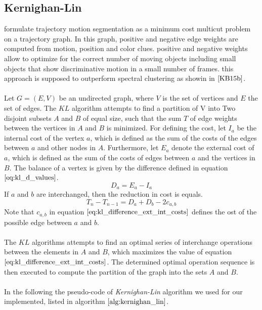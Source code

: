 \subsection{Kernighan-Lin} 
formulate trajectory motion segmentation as a minimum cost multicut problem on a trajectory graph. In this graph, positive and negative edge weights are computed from motion, position and color clues. positive and negative weights allow to optimize for the correct number of moving objects including small objects that show discriminative motion in a small number of frames. this approach is supposed to outperform spectral clustering as showin in $\cite{KB15b}$. \\ \\
Let $G = (E, V)$ be an undirected graph, where $V$ is the set of vertices and $E$ the set of edges. The $KL$ algorithm attempts to find a partition of V into Two disjoint subsets $A$ and $B$ of equal size, such that the sum $T$ of edge weights between the vertices in $A$ and $B$ is minimized. For defining the cost, let $I_a$ be the internal cost of the vertex $a$, which is defined as the sum of the costs of the edges between $a$ and other nodes in $A$. Furthermore, let $E_a$ denote the external cost of $a$, which is defined as the sum of the costs of edges between $a$ and the vertices in $B$. The balance of a vertex is given by the difference defined in equation $\ref{eq:kl_d_values}$.
\begin{equation}
	D_a = E_a - I_a
\label{eq:kl_d_values}
\end{equation}
If $a$ and $b$ are interchanged, then the reduction in cost is equals.
\begin{equation}
	T_{n} - T_{n-1} = D_a + D_b - 2c_{a,b}
\label{eq:kl_difference_ext_int_costs}
\end{equation}
Note that $c_{a,b}$ in equation $\ref{eq:kl_difference_ext_int_costs}$ defines the ost of the possible edge between $a$ and $b$. \\ \\
The $KL$ algorithms attempts to find an optimal series of interchange operations between the elements in $A$ and $B$, which maximizes the value of equation $\ref{eq:kl_difference_ext_int_costs}$. The determined optimal operation sequence is then executed to compute the partition of the graph into the sets $A$ and $B$. \\ \\
In the following the pseudo-code of \emph{Kernighan-Lin} algorithm we used for our implemented, listed in algorithm $\ref{alg:kernighan_lin}$.
